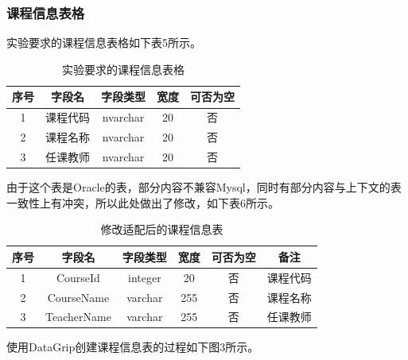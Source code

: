 \documentclass[a4paper,UTF8,heading=false,12pt]{article}
\begin{document}
    \subsubsection{课程信息表格}

    实验要求的课程信息表格如下表5所示。

    \begin{table}[htbp]
        \begin{center}
            \begin{tabular}{@{}ccccc@{}}
            \toprule
            序号 & 字段名  & 字段类型     & 宽度 & 可否为空 \\ \midrule
            1  & 课程代码   & nvarchar & 20 & 否    \\
            2  & 课程名称   & nvarchar & 20 & 否    \\
            3  & 任课教师   & nvarchar & 20 & 否    \\\bottomrule
            \end{tabular}
            \caption{实验要求的课程信息表格}
        \end{center}
    \end{table}

    由于这个表是Oracle的表，部分内容不兼容Mysql，同时有部分内容与上下文的表一致性上有冲突，所以此处做出了修改，如下表6所示。

    \begin{table}[htbp]
        \begin{center}
            \begin{tabular}{@{}cccccc@{}}
                \toprule
                序号 & 字段名         & 字段类型    & 宽度  & 可否为空 & 备注   \\ \midrule
                1  & CourseId   & integer & 20  & 否    & 课程代码   \\
                2  & CourseName & varchar & 255 & 否    & 课程名称   \\
                3  & TeacherName     & varchar & 255  & 否    & 任课教师   \\ \bottomrule
                \end{tabular}
                \caption{修改适配后的课程信息表}
        \end{center}
    \end{table}

    使用DataGrip创建课程信息表的过程如下图3所示。
\end{document}
